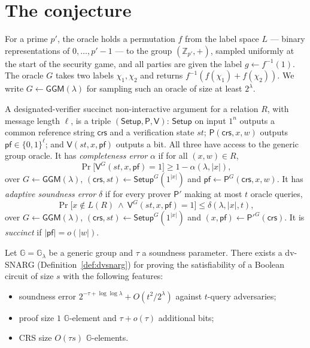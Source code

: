 \documentclass{aicr-conjecture}
\newcommand{\G}{\mathbb{G}}
\newcommand{\bits}{\{0,1\}}
\newcommand{\Setup}{\mathsf{Setup}}
\newcommand{\Prov}{\mathsf{P}}
\newcommand{\Ver}{\mathsf{V}}
\newcommand{\crs}{\mathsf{crs}}
\newcommand{\GGM}{\mathsf{GGM}}
\newcommand{\pf}{\mathsf{pf}}
\begin{document}
\section{The conjecture}\label{sec:conjectures}

\begin{definition}\label{def:ggm}
For a prime $p'$, the oracle holds a permutation $f$ from the label space
$L$ --- binary representations of $0, \dots, p'-1$ --- to the group
$(\mathbb{Z}_{p'}, +)$, sampled uniformly at the start of the security
game, and all parties are given the label $g \leftarrow f^{-1}(1)$. The
oracle $G$ takes two labels $\chi_{1}, \chi_{2}$ and returns
$f^{-1}(f(\chi_{1}) + f(\chi_{2}))$. We write $G \leftarrow \GGM(\lambda)$
for sampling such an oracle of size at least $2^{\lambda}$.
\end{definition}

\begin{definition}\label{def:dvsnarg}
A designated-verifier succinct non-interactive argument for a relation
$R$, with message length $\ell$, is a triple $(\Setup, \Prov, \Ver)$:
$\Setup$ on input $1^{n}$ outputs a common reference string $\crs$ and a
verification state $st$; $\Prov(\crs, x, w)$ outputs $\pf \in
\bits^{\ell}$; and $\Ver(st, x, \pf)$ outputs a bit. All three have
access to the generic group oracle. It has \emph{completeness error}
$\alpha$ if for all $(x,w) \in R$,
\[
  \Pr\bigl[ \Ver^{G}(st, x, \pf) = 1 \bigr] \ge 1 - \alpha(\lambda,|x|),
\]
over $G \leftarrow \GGM(\lambda)$, $(\crs, st) \leftarrow
\Setup^{G}(1^{|x|})$ and $\pf \leftarrow \Prov^{G}(\crs, x, w)$. It has
\emph{adaptive soundness error} $\delta$ if for every prover $\Prov'$
making at most $t$ oracle queries,
\[
  \Pr\bigl[ x \notin L(R) \ \wedge\ \Ver^{G}(st,x,\pf) = 1 \bigr]
  \le \delta(\lambda, |x|, t),
\]
over $G \leftarrow \GGM(\lambda)$, $(\crs, st) \leftarrow
\Setup^{G}(1^{|x|})$ and $(x, \pf) \leftarrow \Prov'^{G}(\crs)$. It is
\emph{succinct} if $|\pf| = o(|w|)$.
\end{definition}

\begin{conjecture}\label{conj:main}
Let $\G = \G_{\lambda}$ be a generic group and $\tau$ a soundness
parameter. There exists a dv-SNARG (Definition~\ref{def:dvsnarg}) for
proving the satisfiability of a Boolean circuit of size $s$ with the
following features:
\begin{itemize}[nosep]
  \item soundness error $2^{-\tau + \log\log\lambda} + O(t^{2}/2^{\lambda})$
    against $t$-query adversaries;
  \item proof size $1$ $\G$-element and $\tau + o(\tau)$ additional bits;
  \item CRS size $O(\tau s)$ $\G$-elements.
\end{itemize}
\end{conjecture}
\end{document}
